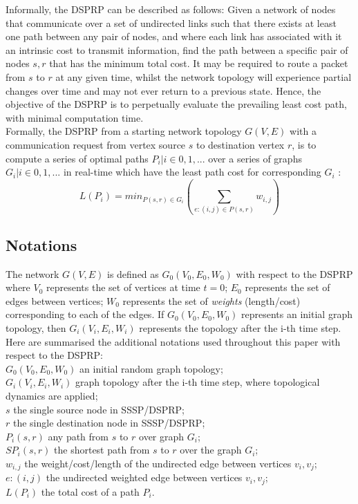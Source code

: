 \documentclass[
	a4paper, %
	10pt, %
	unnumberedsections, %
	twoside, %
]{LTJournalArticle}
\begin{document}
Informally, the DSPRP can be described as follows: Given a network of nodes that communicate over a set of undirected links such that there exists at least one path between any pair of nodes, and where each link has associated with it an intrinsic cost to transmit information, find the path between a specific pair of nodes \(s, r\) that has the minimum total cost. It may be required to route a packet from \(s\) to \(r\) at any given time, whilst the network topology will experience partial changes over time and may not ever return to a previous state. Hence, the objective of the DSPRP is to perpetually evaluate the prevailing least cost path, with minimal computation time. \\

Formally, the DSPRP from a starting network topology \(G(V, E)\) with a communication request from vertex source \(s\) to destination vertex \(r\), is to compute a series of optimal paths \({P_{i} | i \in {0, 1, ...}}\) over a series of graphs \({G_{i} | i \in {0, 1, ...}}\) in real-time which have the least path cost for corresponding \(G_{i}\) \cite{yang:10}: 
\begin{equation}
	 L(P_{i}) = min_{P(s,r) \in G_{i}}(\sum\limits_{e: (i, j) \in P(s, r)} w_{i,j}) 
	\label{eq:sp}
\end{equation}

\subsection{Notations} 

The network \(G(V, E)\) is defined as \(G_{0}(V_{0}, E_{0}, W_{0})\) with respect to the DSPRP  where \(V_{0}\) represents the set of vertices at time \(t = 0\); \(E_{0}\) represents the set of edges between vertices; \(W_{0}\) represents the set of \emph{weights} (length/cost) corresponding to each of the edges. If \( G_{0}(V_{0}, E_{0}, W_{0}) \) represents an initial graph topology, then \(G_{i}(V_{i}, E_{i}, W_{i})\) represents the topology after the i-th time step. \\

Here are summarised the additional notations used throughout this paper with respect to the DSPRP: \\
\( G_{0}(V_{0}, E_{0}, W_{0}) \) an initial random graph topology; \\
\( G_{i}(V_{i}, E_{i}, W_{i}) \) graph topology after the i-th time step, where topological dynamics are applied; \\
\(s\) the single source node in SSSP/DSPRP; \\
\(r\) the single destination node in SSSP/DSPRP; \\
\(P_{i}(s, r)\) any path from \(s\) to \(r\) over graph \( G_{i} \); \\
\(SP_{i}(s, r)\) the shortest path from \(s\) to \(r\) over the graph \(G_{i}\); \\
\(w_{i, j}\) the weight/cost/length of the undirected edge between vertices \(v_{i}, v_{j}\); \\
\(e: (i, j) \) the undirected weighted edge between vertices \(v_{i}, v_{j}\);\\
\(L(P_{i})\) the total cost of a path \(P_{i}\). 
\end{document}
